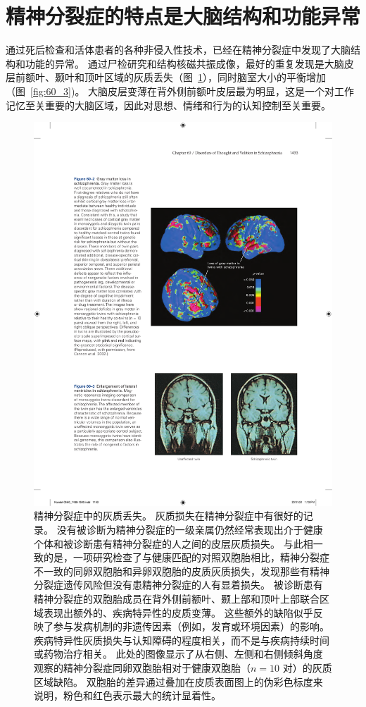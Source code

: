 \section{精神分裂症的特点是大脑结构和功能异常}

通过死后检查和活体患者的各种非侵入性技术，已经在精神分裂症中发现了大脑结构和功能的异常。
通过尸检研究和结构核磁共振成像，最好的重复发现是大脑皮层前额叶、颞叶和顶叶区域的灰质丢失（图~\ref{fig:60_2}），同时脑室大小的平衡增加（图~\ref{fig:60_3})。
大脑皮层变薄在背外侧前额叶皮层最为明显，这是一个对工作记忆至关重要的大脑区域，因此对思想、情绪和行为的认知控制至关重要。



\begin{figure}[htbp]
	\centering
	\includegraphics[width=0.7\linewidth]{chap60/fig_60_2}
	\caption{精神分裂症中的灰质丢失。
		灰质损失在精神分裂症中有很好的记录。
		没有被诊断为精神分裂症的一级亲属仍然经常表现出介于健康个体和被诊断患有精神分裂症的人之间的皮层灰质损失。
		与此相一致的是，一项研究检查了与健康匹配的对照双胞胎相比，精神分裂症不一致的同卵双胞胎和异卵双胞胎的皮质灰质损失，发现那些有精神分裂症遗传风险但没有患精神分裂症的人有显着损失。
		被诊断患有精神分裂症的双胞胎成员在背外侧前额叶、颞上部和顶叶上部联合区域表现出额外的、疾病特异性的皮质变薄。
		这些额外的缺陷似乎反映了参与发病机制的非遗传因素（例如，发育或环境因素）的影响。
		疾病特异性灰质损失与认知障碍的程度相关，而不是与疾病持续时间或药物治疗相关。
		此处的图像显示了从右侧、左侧和右侧倾斜角度观察的精神分裂症同卵双胞胎相对于健康双胞胎（$ n = 10 $ 对）的灰质区域缺陷。
		双胞胎的差异通过叠加在皮质表面图上的伪彩色标度来说明，粉色和红色表示最大的统计显着性\cite{cannon2002cortex}。}
	\label{fig:60_2}
\end{figure}


